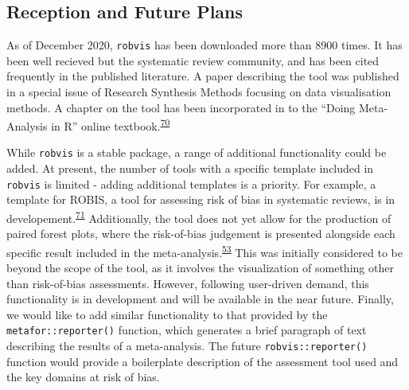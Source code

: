 \documentclass[a4paper, twoside]{templates/ociamthesis}
\newcommand*{\bibtitle}{Bibliography}
\begin{document}
\hypertarget{reception-and-future-plans-1}{%
\subsection{Reception and Future Plans}\label{reception-and-future-plans-1}}

As of December 2020, \texttt{robvis} has been downloaded more than 8900 times. It has been well recieved but the systematic review community, and has been cited frequently in the published literature. A paper describing the tool was published in a special issue of Research Synthesis Methods focusing on data visualisation methods. A chapter on the tool has been incorporated in to the ``Doing Meta-Analysis in R'' online textbook.\textsuperscript{\protect\hyperlink{ref-mathias_harrer_2019_2551803}{70}}

While \texttt{robvis} is a stable package, a range of additional functionality could be added. At present, the number of tools with a specific template included in \texttt{robvis} is limited - adding additional templates is a priority. For example, a template for ROBIS, a tool for assessing risk of bias in systematic reviews, is in developement.\textsuperscript{\protect\hyperlink{ref-whiting2016robis}{71}} Additionally, the tool does not yet allow for the production of paired forest plots, where the risk-of-bias judgement is presented alongside each specific result included in the meta-analysis.\textsuperscript{\protect\hyperlink{ref-cochranechpt7}{53}} This was initially considered to be beyond the scope of the tool, as it involves the visualization of something other than risk-of-bias assessments. However, following user-driven demand, this functionality is in development and will be available in the near future. Finally, we would like to add similar functionality to that provided by the \texttt{metafor::reporter()} function, which generates a brief paragraph of text describing the results of a meta-analysis. The future \texttt{robvis::reporter()} function would provide a boilerplate description of the assessment tool used and the key domains at risk of bias.




\setlength{\baselineskip}{0pt} %

{\renewcommand*\MakeUppercase[1]{#1}%
\printbibliography[heading=bibintoc,title={\bibtitle}]}
\end{document}
